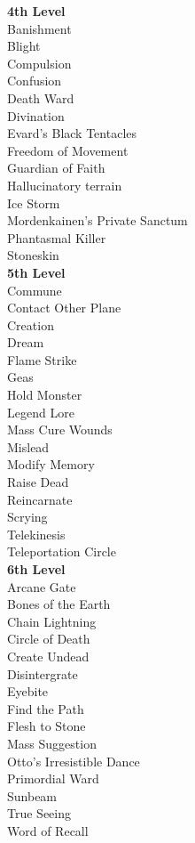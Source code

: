 \textbf{4th Level} \\
 Banishment \\
 Blight \\
 Compulsion \\
 Confusion \\
 Death Ward \\
 Divination \\
 Evard's Black Tentacles \\
 Freedom of Movement \\
 Guardian of Faith \\
 Hallucinatory terrain \\
 Ice Storm \\
 Mordenkainen's Private Sanctum \\
 Phantasmal Killer \\
 Stoneskin \\

\textbf{5th Level} \\
 Commune \\
 Contact Other Plane \\
 Creation \\
 Dream \\
 Flame Strike \\
 Geas \\
 Hold Monster \\
 Legend Lore \\
 Mass Cure Wounds \\
 Mislead \\
 Modify Memory \\
 Raise Dead \\
 Reincarnate \\
 Scrying \\
 Telekinesis \\
 Teleportation Circle \\

\textbf{6th Level} \\
 Arcane Gate \\
 Bones of the Earth \\
 Chain Lightning \\
 Circle of Death \\
 Create Undead \\
 Disintergrate \\
 Eyebite \\
 Find the Path \\
 Flesh to Stone \\
 Mass Suggestion \\
 Otto's Irresistible Dance \\
 Primordial Ward \\
 Sunbeam \\
 True Seeing \\
 Word of Recall \\

